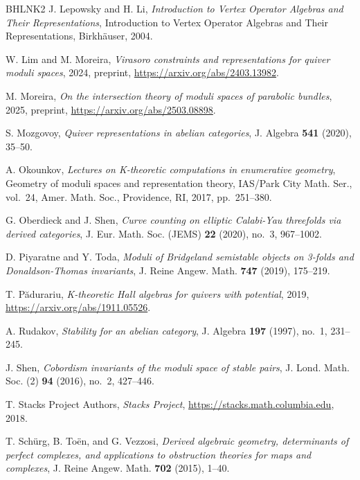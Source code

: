 \documentclass[12pt]{amsart}
\theoremstyle{definition}
\newcommand{\1}{\mathbf 1}
\begin{document}
\begin{thebibliography}{BHLNK2}
J. Lepowsky and H. Li, \emph{Introduction to Vertex Operator Algebras and Their Representations}, Introduction to Vertex Operator Algebras and Their Representations, Birkh{\"a}user, 2004.

W. Lim and M. Moreira, \emph{Virasoro constraints and representations for quiver moduli spaces}, 2024, preprint, \url{https://arxiv.org/abs/2403.13982}.

M. Moreira, \emph{On the intersection theory of moduli spaces of parabolic bundles}, 2025, preprint, \url{https://arxiv.org/abs/2503.08898}.

S. Mozgovoy, \emph{Quiver representations in abelian categories}, J. Algebra \textbf{541} (2020), 35--50.

A. Okounkov, \emph{Lectures on {K}-theoretic computations in enumerative geometry}, Geometry of moduli spaces and representation theory, IAS/Park City Math. Ser., vol.~24, Amer. Math. Soc., Providence, RI, 2017, pp.~251--380.

G. Oberdieck and J. Shen, \emph{Curve counting on elliptic {C}alabi-{Y}au threefolds via derived categories}, J. Eur. Math. Soc. (JEMS) \textbf{22} (2020), no.~3, 967--1002.

D. Piyaratne and Y. Toda, \emph{Moduli of {B}ridgeland semistable objects on 3-folds and {D}onaldson-{T}homas invariants}, J. Reine Angew. Math. \textbf{747} (2019), 175--219.

T. Pădurariu, \emph{K-theoretic Hall algebras for quivers with potential}, 2019, \url{https://arxiv.org/abs/1911.05526}.

A. Rudakov, \emph{Stability for an abelian category}, J. Algebra \textbf{197} (1997), no.~1, 231--245.

J. Shen, \emph{Cobordism invariants of the moduli space of stable pairs}, J. Lond. Math. Soc. (2) \textbf{94} (2016), no.~2, 427--446.

T. {Stacks Project Authors}, \emph{\textit{Stacks Project}}, \url{https://stacks.math.columbia.edu}, 2018.

T. Sch\"{u}rg, B. To\"{e}n, and G. Vezzosi, \emph{Derived algebraic geometry, determinants of perfect complexes, and applications to obstruction theories for maps and complexes}, J. Reine Angew. Math. \textbf{702} (2015), 1--40.


\end{thebibliography}
\end{document}
